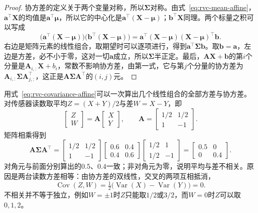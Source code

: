 \begin{proof}
协方差的定义关于两个变量对称，所以$\bm{\Sigma}$对称。由式~\eqref{eq:rvc-mean-affine}，$\bm{a}^{\top}\bm{X}$的均值是$\bm{a}^{\top}\bm{\mu}$，所以它的中心化是$\bm{a}^{\top}(\bm{X}-\bm{\mu})$；$\bm{b}^{\top}\bm{X}$同理。两个标量之积可以写成
\[
 \bigl(\bm{a}^{\top}(\bm{X}-\bm{\mu})\bigr)\bigl(\bm{b}^{\top}(\bm{X}-\bm{\mu})\bigr)
 =\bm{a}^{\top}(\bm{X}-\bm{\mu})(\bm{X}-\bm{\mu})^{\top}\bm{b}.
\]
右边是矩阵元素的线性组合，取期望时可以逐项进行，得到$\bm{a}^{\top}\bm{\Sigma}\bm{b}$。取$\bm{b}=\bm{a}$，左边是方差，必不小于零，这对一切$\bm{a}$成立，所以$\bm{\Sigma}$半正定。最后，$\bm{A}\bm{X}+\bm{b}$的第$i$个分量是$\bm{A}_{i,:}\bm{X}+b_i$，常数不影响协方差，由第一式，它与第$j$个分量的协方差为$\bm{A}_{i,:}\bm{\Sigma}\bm{A}_{j,:}^{\top}$，这正是$\bm{A}\bm{\Sigma}\bm{A}^{\top}$的$(i,j)$元。
\end{proof}

用式~\eqref{eq:rvc-covariance-affine}可以一次算出几个线性组合的全部方差与协方差。对传感器读数取平均$Z=(X+Y)/2$与差$W=X-Y$，即
\[
 \begin{bmatrix}Z\\W\end{bmatrix}=\bm{A}\begin{bmatrix}X\\Y\end{bmatrix},\qquad
 \bm{A}=\begin{bmatrix}1/2&1/2\\1&-1\end{bmatrix}.
\]
矩阵相乘得到
\[
 \bm{A}\bm{\Sigma}\bm{A}^{\top}
 =\begin{bmatrix}1/2&1/2\\1&-1\end{bmatrix}\begin{bmatrix}0.6&0.4\\0.4&0.6\end{bmatrix}\begin{bmatrix}1/2&1\\1/2&-1\end{bmatrix}
 =\begin{bmatrix}0.5&0\\0&0.4\end{bmatrix}.
\]
对角元与前面分别算出的$0.5$、$0.4$一致；非对角元为零，说明平均与差不相关。原因是两台读数方差相等：由协方差的双线性，交叉的两项互相抵消，
\[
 \operatorname{Cov}(Z,W)=\tfrac12\bigl(\operatorname{Var}(X)-\operatorname{Var}(Y)\bigr)=0 .
\]不相关并不等于独立，例如$W=\pm1$时$Z$只能取$1/2$或$3/2$，而$W=0$时$Z$可以取$0,1,2$。

